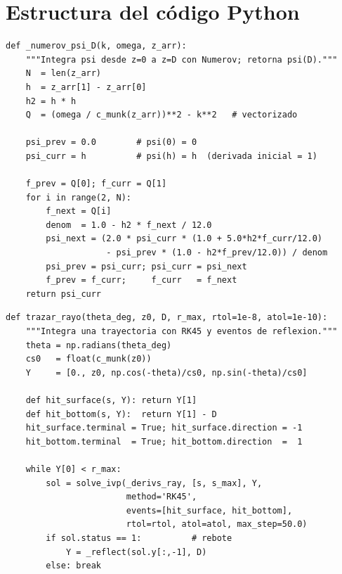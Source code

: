 \documentclass[12pt,a4paper]{article}
\begin{document}
\section{Estructura del código Python}

\begin{lstlisting}[caption={Función de disparo con Numerov (fragmento de \texttt{acustica\_python.py}).},
                   label={lst:numerov}]
def _numerov_psi_D(k, omega, z_arr):
    """Integra psi desde z=0 a z=D con Numerov; retorna psi(D)."""
    N  = len(z_arr)
    h  = z_arr[1] - z_arr[0]
    h2 = h * h
    Q  = (omega / c_munk(z_arr))**2 - k**2   # vectorizado

    psi_prev = 0.0        # psi(0) = 0
    psi_curr = h          # psi(h) = h  (derivada inicial = 1)

    f_prev = Q[0]; f_curr = Q[1]
    for i in range(2, N):
        f_next = Q[i]
        denom  = 1.0 - h2 * f_next / 12.0
        psi_next = (2.0 * psi_curr * (1.0 + 5.0*h2*f_curr/12.0)
                    - psi_prev * (1.0 - h2*f_prev/12.0)) / denom
        psi_prev = psi_curr; psi_curr = psi_next
        f_prev = f_curr;     f_curr   = f_next
    return psi_curr
\end{lstlisting}

\begin{lstlisting}[caption={Trazado de rayos con RK45 adaptativo.},
                   label={lst:rk45}]
def trazar_rayo(theta_deg, z0, D, r_max, rtol=1e-8, atol=1e-10):
    """Integra una trayectoria con RK45 y eventos de reflexion."""
    theta = np.radians(theta_deg)
    cs0   = float(c_munk(z0))
    Y     = [0., z0, np.cos(-theta)/cs0, np.sin(-theta)/cs0]

    def hit_surface(s, Y): return Y[1]
    def hit_bottom(s, Y):  return Y[1] - D
    hit_surface.terminal = True; hit_surface.direction = -1
    hit_bottom.terminal  = True; hit_bottom.direction  =  1

    while Y[0] < r_max:
        sol = solve_ivp(_derivs_ray, [s, s_max], Y,
                        method='RK45',
                        events=[hit_surface, hit_bottom],
                        rtol=rtol, atol=atol, max_step=50.0)
        if sol.status == 1:          # rebote
            Y = _reflect(sol.y[:,-1], D)
        else: break
\end{lstlisting}
\end{document}
